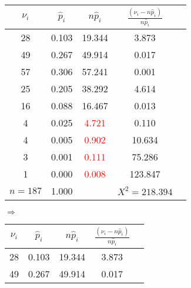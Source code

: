 \documentclass[a4paper,12pt]{article}
\begin{document}
\begin{enumerate}
              \begin{tabular}{|c|c|c|c|c|}
                  \hline
                  $\nu_i$   & $\widehat{p}_i$ & $n \widehat{p}_i$      & $\frac{(\nu_i - n \widehat{p}_i)}{n \widehat{p}_i}$ \\
                  \hline
                  28        & 0.103           & 19.344                 & 3.873                                               \\
                  49        & 0.267           & 49.914                 & 0.017                                               \\
                  57        & 0.306           & 57.241                 & 0.001                                               \\
                  25        & 0.205           & 38.292                 & 4.614                                               \\
                  16        & 0.088           & 16.467                 & 0.013                                               \\
                  4         & 0.025           & \textcolor{red}{4.721} & 0.110                                               \\
                  4         & 0.005           & \textcolor{red}{0.902} & 10.634                                              \\
                  3         & 0.001           & \textcolor{red}{0.111} & 75.286                                              \\
                  1         & 0.000           & \textcolor{red}{0.008} & 123.847                                             \\
                  \hline
                  $n = 187$ & 1.000           &                        & $X^2 = 218.394$                                     \\
                  \hline
              \end{tabular}
              $\Rightarrow$
              \begin{tabular}{|c|c|c|c|c|}
                  \hline
                  $\nu_i$   & $\widehat{p}_i$ & $n \widehat{p}_i$ & $\frac{(\nu_i - n \widehat{p}_i)}{n \widehat{p}_i}$ \\
                  \hline
                  28        & 0.103           & 19.344            & 3.873                                               \\
                  49        & 0.267           & 49.914            & 0.017                                               \\

\end{tabular}
\end{enumerate}
\end{document}
